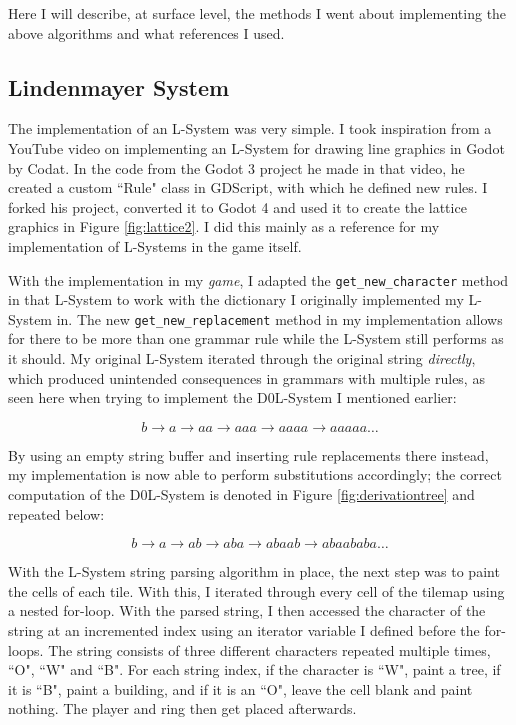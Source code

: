 Here I will describe, at surface level, the methods I went about implementing the above algorithms and what references I used.

\subsection{Lindenmayer System}

The implementation of an L-System was very simple. I took inspiration from a YouTube video on implementing an L-System for drawing line graphics in Godot by Codat.\cite{codatGD3LSystemYT} In the code from the Godot 3 project he made in that video\cite{codatGD3LSystemGH}\cite{codatGD3LSystemYT}, he created a custom ``Rule" class in GDScript, with which he defined new rules. I forked his project, converted it to Godot 4 and used it to create the lattice graphics in Figure \ref{fig:lattice2}.\cite{codatGD4LSystemGH} I did this mainly as a reference for my implementation of L-Systems in the game itself.

With the implementation in my \emph{game}, I adapted the \verb|get_new_character| method in that L-System to work with the dictionary I originally implemented my L-System in. The new \verb|get_new_replacement| method in my implementation allows for there to be more than one grammar rule while the L-System still performs as it should. My original L-System iterated through the original string \textit{directly}, which produced unintended consequences in grammars with multiple rules, as seen here when trying to implement the D0L-System I mentioned earlier\cite{lsystemintro}:

$$ b \rightarrow a \rightarrow aa \rightarrow aaa \rightarrow aaaa \rightarrow aaaaa \ldots $$

By using an empty string buffer and inserting rule replacements there instead, my implementation is now able to perform substitutions accordingly; the correct computation of the D0L-System is denoted in Figure \ref{fig:derivationtree} and repeated below:

$$ b \rightarrow a \rightarrow ab \rightarrow aba \rightarrow abaab \rightarrow abaababa \ldots $$

With the L-System string parsing algorithm in place, the next step was to paint the cells of each tile. With this, I iterated through every cell of the tilemap using a nested for-loop. With the parsed string, I then accessed the character of the string at an incremented index using an iterator variable I defined before the for-loops. The string consists of three different characters repeated multiple times, ``O", ``W" and ``B". For each string index, if the character is ``W", paint a tree, if it is ``B", paint a building, and if it is an ``O", leave the cell blank and paint nothing. The player and ring then get placed afterwards.

